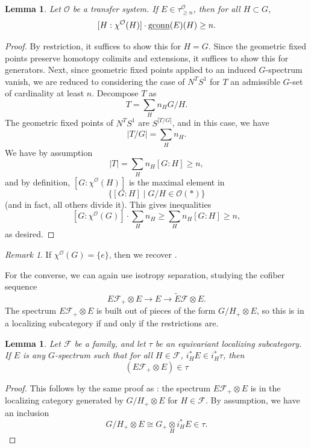 \documentclass{amsart}
\newcommand{\otimesover}[1]{\underset{#1}{\otimes}}
\newcommand{\m}[1]{{\protect\underline{#1}}}
\newcommand{\cc}[1]{\mathcal #1}
\newcommand{\cO}{\cc{O}}
\DeclareMathOperator{\conn}{conn}
\DeclareMathOperator{\mgconn}{g\m{\conn}}
\numberwithin{equation}{section}
\newtheorem{lemma}[theorem]{Lemma}
\theoremstyle{remark}
\newtheorem{remark}[theorem]{Remark}
\theoremstyle{definition}
\newcommand{\sma}{\otimes}
\begin{document}
\begin{lemma}\label{lem: Slice Connectivity implies Geometric connectivity}
    Let \(\cO\) be a transfer system. If \(E\in\tau_{\geq n}^{\cO}\), then for all \(H\subset G\), 
    \[
        [H:\chi^{\cO}(H)]\cdot \mgconn(E)(H)\geq n.
    \]
\end{lemma}
\begin{proof}
    By restriction, it suffices to show this for \(H=G\). Since the geometric fixed points preserve homotopy colimits and extensions, it suffices to show this for generators.  Next, since geometric fixed points applied to an induced $G$-spectrum vanish, we are reduced to considering the case of \(N^T S^1\) for \(T\) an admissible \(G\)-set of cardinality at least \(n\). Decompose $T$ as
    \[
    T=\sum_{H} n_H G/H.
    \]
    The geometric fixed points of \(N^T S^1\) are \(S^{|T/G|}\), and in this case, we have
    \[
    |T/G|=\sum_H n_H.
    \]
    We have by assumption
    \[
    |T|=\sum_{H} n_H[G:H]\geq n,
    \]
    and by definition, \([G:\chi^{\cO}(H)]\) is the maximal element in 
    \[
    \big\{[G:H]\mid G/H\in\cO(\ast)\big\}
    \]
    (and in fact, all others divide it). This gives inequalities
    \[
    [G:\chi^{\cO}(G)]\cdot \sum_{H} n_H\geq \sum_{H} n_H [G:H]\geq n,
    \]
    as desired.
\end{proof}

\begin{remark}
    If \(\chi^\cO(G)=\{e\}\), then we recover \cite[Theorem 2.5]{HillYarnall}.
\end{remark}

For the converse, we can again use isotropy separation, studying the cofiber sequence
\[
E\mathcal F_+\sma E\to E\to \tilde{E}\mathcal F\sma E.
\]  
The spectrum \(E\mathcal F_+\sma E\) is built out of pieces of the form \(G/H_+\sma E\), so this is in a localizing subcategory if and only if the restrictions are.

\begin{lemma}\label{lem: Localizing Cats and Families}
    Let \(\mathcal F\) be a family, and let \(\tau\) be an equivariant localizing subcategory. If \(E\) is any \(G\)-spectrum such that for all \(H\in\mathcal F\), \(i_H^\ast E\in i_H^{\ast}\tau\), then
    \[
    (E\mathcal F_+\sma E)\in\tau
    \]
\end{lemma}
\begin{proof}
    This follows by the same proof as \cite[Lemma 2.4]{HillYarnall}: the spectrum \(E\mathcal F_+\otimes E\) is in the localizing category generated by \(G/H_+\otimes E\) for \(H\in\mathcal F\). By assumption, we have an inclusion
    \[
        G/H_+\otimes E\cong G_+\otimesover{H} i_H^\ast E\in\tau.
    \]
\end{proof}
\end{document}
